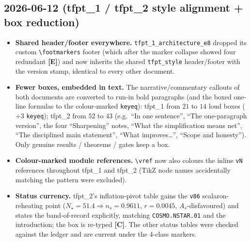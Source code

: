 \documentclass[11pt]{article}
\providecommand{\mE}{\textbf{[E]}}\providecommand{\mC}{\textbf{[C]}}
\providecommand{\vref}[1]{\texttt{#1}}
\begin{document}
\subsection*{2026-06-12 (tfpt\_1 / tfpt\_2 style alignment + box reduction)}
\begin{itemize}
\item \textbf{Shared header/footer everywhere.} \texttt{tfpt\_1\_architecture\_e8} dropped its custom
  \texttt{\textbackslash footmarkers} footer (which after the marker collapse showed four redundant
  \mE) and now inherits the shared \texttt{tfpt\_style} header/footer with the version stamp, identical
  to every other document.
\item \textbf{Fewer boxes, embedded in text.} The narrative/commentary callouts of both documents are
  converted to run-in bold paragraphs (and the boxed one-line formulas to the colour-marked
  \texttt{keyeq}): tfpt\_1 from $21$ to $14$ loud boxes ($+3$ \texttt{keyeq}); tfpt\_2 from $52$ to $43$
  (e.g.\ ``In one sentence'', ``The one-paragraph version'', the four ``Sharpening'' notes, ``What the
  simplification means net'', ``The disciplined main statement'', ``What improves\ldots'', ``Scope and
  honesty''). Only genuine results / theorems / gates keep a box.
\item \textbf{Colour-marked module references.} \texttt{\textbackslash vref} now also colours the inline
  \texttt{vN} references throughout tfpt\_1 and tfpt\_2 (TikZ node names accidentally matching the
  pattern were excluded).
\item \textbf{Status currency.} tfpt\_2's inflation-pivot table gains the \vref{v86} scalaron-reheating
  point ($N_\star{=}51.4\Rightarrow n_s{=}0.9611$, $r{=}0.0045$, $A_s$-disfavoured) and states the
  band-of-record explicitly, matching \texttt{COSMO.NSTAR.01} and the introduction; the box is re-typed
  \mC. The other status tables were checked against the ledger and are current under the 4-class markers.
\end{itemize}
\end{document}
